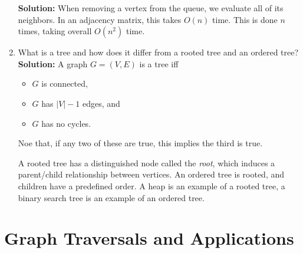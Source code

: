 \documentclass[letterpaper,11pt]{article}
\begin{document}
\begin{enumerate}
\textbf{Solution:} When removing a vertex from the queue, we evaluate all of its neighbors. In an adjacency matrix, this takes $O(n)$ time. This is done $n$ times, taking overall $O(n^2)$ time.

\item What is a tree and how does it differ from a rooted tree and an ordered tree?\\

\textbf{Solution:} A graph $G = (V,E)$ is a tree iff
\begin{itemize}
\item $G$ is connected,
\item $G$ has $|V| - 1$ edges, and
\item $G$ has no cycles.
\end{itemize}

Noe that, if any two of these are true, this implies the third is true.

A rooted tree has a distinguished node called the \emph{root}, which induces a parent/child relationship between vertices. An ordered tree is rooted, and children have a predefined order. A heap is an example of a rooted tree, a binary search tree is an example of an ordered tree.

\end{enumerate}

\section{Graph Traversals and Applications}
\end{document}

